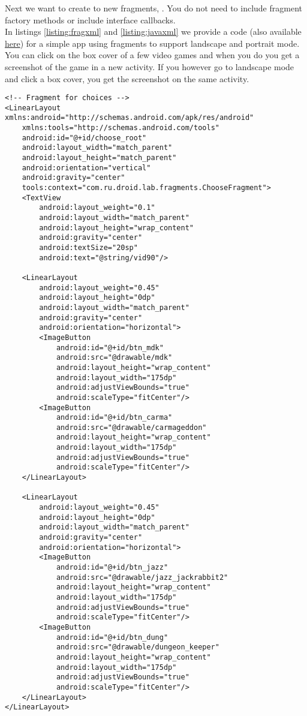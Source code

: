 Next we want to create to new fragments, . You do not need to include fragment factory methods or include interface callbacks.\\

In listings \ref{listing:fragxml} and \ref{listing:javaxml} we provide a code (also available \href{www.TODO.com}{here}) for a simple app using fragments to support landscape and portrait mode. You can click on the box cover of a few video games and when you do you get a screenshot of the game in a new activity. If you however go to landscape mode and click a box cover, you get the screenshot on the same activity.

\begin{lstlisting}[style=A_XML, caption={XML for fragment example}, label={listing:fragxml}]
<!-- Fragment for choices -->
<LinearLayout xmlns:android="http://schemas.android.com/apk/res/android"
    xmlns:tools="http://schemas.android.com/tools"
    android:id="@+id/choose_root"
    android:layout_width="match_parent"
    android:layout_height="match_parent"
    android:orientation="vertical"
    android:gravity="center"
    tools:context="com.ru.droid.lab.fragments.ChooseFragment">
    <TextView
        android:layout_weight="0.1"
        android:layout_width="match_parent"
        android:layout_height="wrap_content"
        android:gravity="center"
        android:textSize="20sp"
        android:text="@string/vid90"/>

    <LinearLayout
        android:layout_weight="0.45"
        android:layout_height="0dp"
        android:layout_width="match_parent"
        android:gravity="center"
        android:orientation="horizontal">
        <ImageButton
            android:id="@+id/btn_mdk"
            android:src="@drawable/mdk"
            android:layout_height="wrap_content"
            android:layout_width="175dp"
            android:adjustViewBounds="true"
            android:scaleType="fitCenter"/>
        <ImageButton
            android:id="@+id/btn_carma"
            android:src="@drawable/carmageddon"
            android:layout_height="wrap_content"
            android:layout_width="175dp"
            android:adjustViewBounds="true"
            android:scaleType="fitCenter"/>
    </LinearLayout>

    <LinearLayout
        android:layout_weight="0.45"
        android:layout_height="0dp"
        android:layout_width="match_parent"
        android:gravity="center"
        android:orientation="horizontal">
        <ImageButton
            android:id="@+id/btn_jazz"
            android:src="@drawable/jazz_jackrabbit2"
            android:layout_height="wrap_content"
            android:layout_width="175dp"
            android:adjustViewBounds="true"
            android:scaleType="fitCenter"/>
        <ImageButton
            android:id="@+id/btn_dung"
            android:src="@drawable/dungeon_keeper"
            android:layout_height="wrap_content"
            android:layout_width="175dp"
            android:adjustViewBounds="true"
            android:scaleType="fitCenter"/>
    </LinearLayout>
</LinearLayout>


\end{lstlisting}
